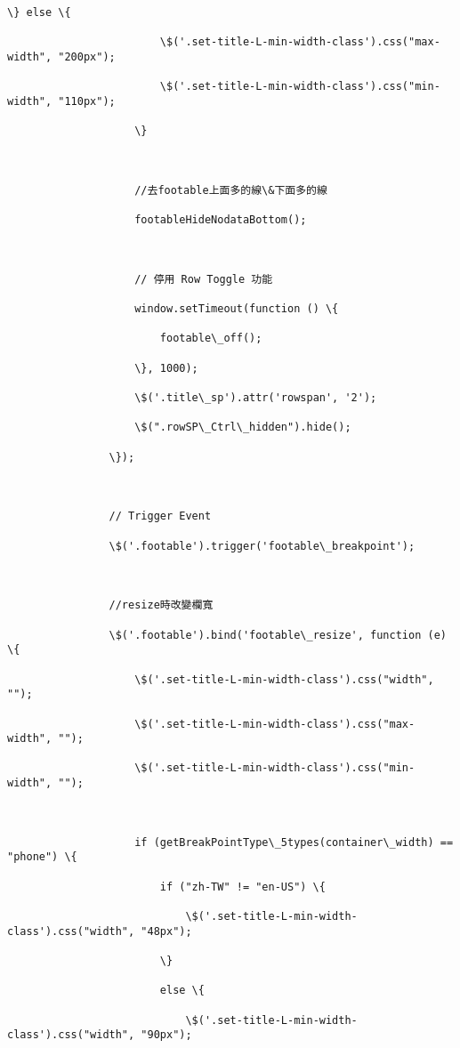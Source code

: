 \documentclass[11pt]{article}
\begin{document}
\begin{Verbatim}[commandchars=\\\{\}]
                    \} else \{

                        \$('.set-title-L-min-width-class').css("max-width", "200px");

                        \$('.set-title-L-min-width-class').css("min-width", "110px");

                    \}



                    //去footable上面多的線\&下面多的線

                    footableHideNodataBottom();



                    // 停用 Row Toggle 功能

                    window.setTimeout(function () \{

                        footable\_off();

                    \}, 1000);

                    \$('.title\_sp').attr('rowspan', '2');

                    \$(".rowSP\_Ctrl\_hidden").hide();

                \});



                // Trigger Event

                \$('.footable').trigger('footable\_breakpoint');



                //resize時改變欄寬

                \$('.footable').bind('footable\_resize', function (e) \{

                    \$('.set-title-L-min-width-class').css("width", "");

                    \$('.set-title-L-min-width-class').css("max-width", "");

                    \$('.set-title-L-min-width-class').css("min-width", "");



                    if (getBreakPointType\_5types(container\_width) == "phone") \{

                        if ("zh-TW" != "en-US") \{

                            \$('.set-title-L-min-width-class').css("width", "48px");

                        \}

                        else \{

                            \$('.set-title-L-min-width-class').css("width", "90px");


\end{Verbatim}
\end{document}
